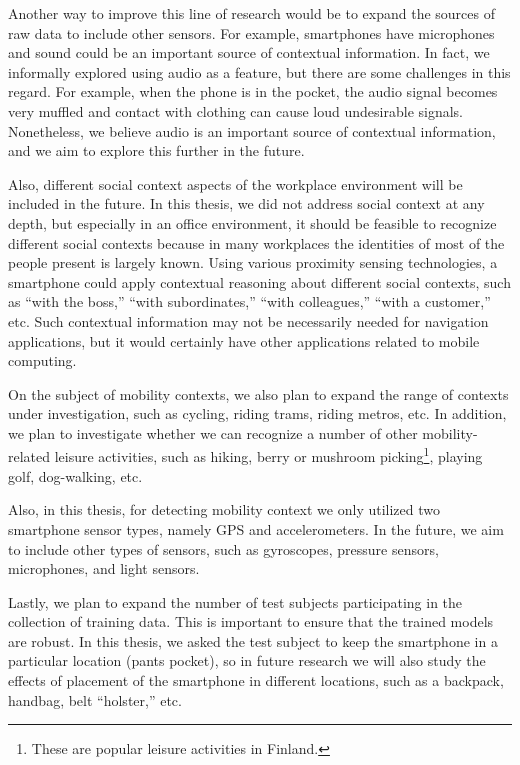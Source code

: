 Another way to improve this line of research would be to expand the sources of raw data to include other sensors. For example, smartphones have microphones and sound could be an important source of contextual information. In fact, we informally explored using audio as a feature, but there are some challenges in this regard. For example, when the phone is in the pocket, the audio signal becomes very muffled and contact with clothing can cause loud undesirable signals. Nonetheless, we believe audio is an important source of contextual information, and we aim to explore this further in the future.

Also, different social context aspects of the workplace environment will be included in the future. In this thesis, we did not address social context at any depth, but especially in an office environment, it should be feasible to recognize different social contexts because in many workplaces the identities of most of the people present is largely known. Using various proximity sensing technologies, a smartphone could apply contextual reasoning about different social contexts, such as ``with the boss,'' ``with subordinates,'' ``with colleagues,'' ``with a customer,'' etc. Such contextual information may not be necessarily needed for navigation applications, but it would certainly have other applications related to mobile computing.

On the subject of mobility contexts, we also plan to expand the range of contexts under investigation, such as cycling, riding trams, riding metros, etc. In addition, we plan to investigate whether we can recognize a number of other mobility-related leisure activities, such as hiking, berry or mushroom picking\footnote{These are popular leisure activities in Finland.}, playing golf, dog-walking, etc.

Also, in this thesis, for detecting mobility context we only utilized two smartphone sensor types, namely GPS and accelerometers. In the future, we aim to include other types of sensors, such as gyroscopes, pressure sensors, microphones, and light sensors.

Lastly, we plan to expand the number of test subjects participating in the collection of training data. This is important to ensure that the trained models are robust. In this thesis, we asked the test subject to keep the smartphone in a particular location (pants pocket), so in future research we will also study the effects of placement of the smartphone in different locations, such as a backpack, handbag, belt ``holster,'' etc.

